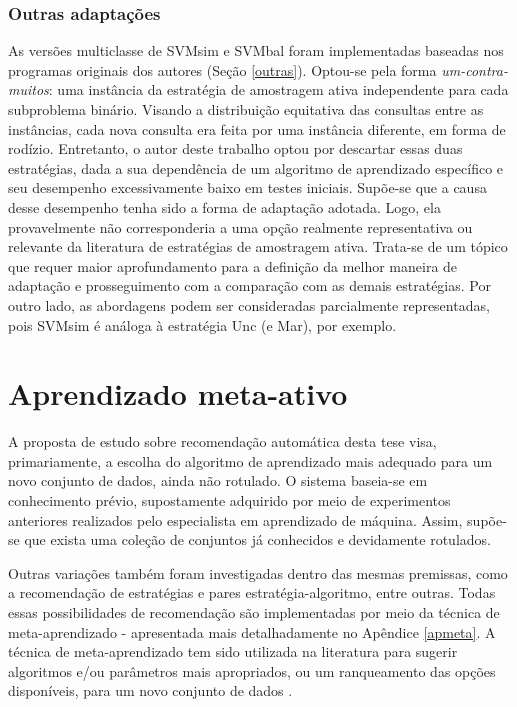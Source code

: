 \subsubsection{Outras adaptações}
As versões multiclasse de SVMsim e SVMbal foram implementadas baseadas nos programas originais dos autores (Seção \ref{outras}).
Optou-se pela forma \textit{um-contra-muitos}: uma instância da estratégia de amostragem ativa independente para cada subproblema binário.
Visando a distribuição equitativa das consultas entre as instâncias, cada nova consulta era feita por uma instância diferente, em forma de rodízio.
Entretanto, o autor deste trabalho optou por descartar essas duas estratégias, dada a sua dependência de um algoritmo de aprendizado específico e seu desempenho excessivamente baixo em testes iniciais.
Supõe-se que a causa desse desempenho tenha sido a forma de adaptação adotada.
Logo, ela provavelmente não corresponderia a uma opção realmente representativa ou relevante da literatura de estratégias de amostragem ativa.
Trata-se de um tópico que requer maior aprofundamento para a definição da melhor maneira de adaptação e prosseguimento com a comparação com as demais estratégias.
Por outro lado, as abordagens podem ser consideradas parcialmente representadas, pois SVMsim é análoga à estratégia Unc (e Mar), por exemplo.

\section{Aprendizado meta-ativo}\label{sec:ama}
A proposta de estudo sobre recomendação automática desta tese visa, primariamente, a escolha do algoritmo de aprendizado mais adequado para um novo conjunto de dados, ainda não rotulado.
O sistema baseia-se em conhecimento prévio, supostamente adquirido por meio de experimentos anteriores realizados pelo especialista em aprendizado de máquina.
Assim, supõe-se que exista uma coleção de conjuntos já conhecidos e devidamente rotulados.

Outras variações também foram investigadas dentro das mesmas premissas, como a recomendação de estratégias e pares estratégia-algoritmo, entre outras.
Todas essas possibilidades de recomendação são implementadas por meio da técnica de meta-aprendizado - apresentada mais detalhadamente no Apêndice \ref{apmeta}.
A técnica de meta-aprendizado tem sido utilizada na literatura para sugerir algoritmos e/ou parâmetros mais apropriados, ou um ranqueamento das opções disponíveis, para um novo conjunto de dados \cite{books/daglib/0022052}.

